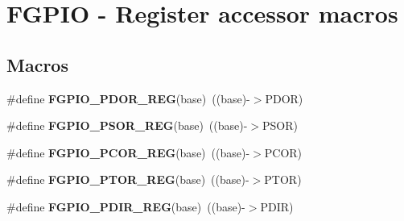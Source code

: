 \hypertarget{group___f_g_p_i_o___register___accessor___macros}{}\section{F\+G\+P\+IO -\/ Register accessor macros}
\label{group___f_g_p_i_o___register___accessor___macros}
\subsection*{Macros}
\begin{DoxyCompactItemize}
\item 
\mbox{\label{group___f_g_p_i_o___register___accessor___macros_gacc864141de88d48cc2bcfeb7e7561355}} 
\#define {\bfseries F\+G\+P\+I\+O\+\_\+\+P\+D\+O\+R\+\_\+\+R\+EG}(base)~((base)-\/$>$P\+D\+OR)
\item 
\mbox{\label{group___f_g_p_i_o___register___accessor___macros_ga54a29c014c762391371b2f8dce53a89d}} 
\#define {\bfseries F\+G\+P\+I\+O\+\_\+\+P\+S\+O\+R\+\_\+\+R\+EG}(base)~((base)-\/$>$P\+S\+OR)
\item 
\mbox{\label{group___f_g_p_i_o___register___accessor___macros_gafc8a737aad6f10b837eea247f548c2c9}} 
\#define {\bfseries F\+G\+P\+I\+O\+\_\+\+P\+C\+O\+R\+\_\+\+R\+EG}(base)~((base)-\/$>$P\+C\+OR)
\item 
\mbox{\label{group___f_g_p_i_o___register___accessor___macros_ga437196d610550fb3c534d267d06199b8}} 
\#define {\bfseries F\+G\+P\+I\+O\+\_\+\+P\+T\+O\+R\+\_\+\+R\+EG}(base)~((base)-\/$>$P\+T\+OR)
\item 
\mbox{\label{group___f_g_p_i_o___register___accessor___macros_gacfddb4a1de217cf1491c5dd88fca546a}} 
\#define {\bfseries F\+G\+P\+I\+O\+\_\+\+P\+D\+I\+R\+\_\+\+R\+EG}(base)~((base)-\/$>$P\+D\+IR)
\item 
\mbox{\label{group___f_g_p_i_o___register___accessor___macros_gab7e22aa4413933045d874108bdf09478}} 

\end{DoxyCompactItemize}
